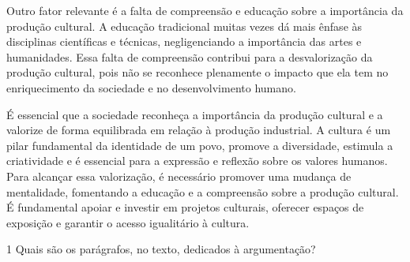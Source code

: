 \begin{escolha}
\begin{escolha}
\begin{escolha}
\begin{escolha}
\begin{escolha}
\begin{escolha}
\begin{escolha}
\begin{escolha}
Outro fator relevante é a falta de compreensão e educação sobre a
importância da produção cultural. A educação tradicional muitas vezes dá
mais ênfase às disciplinas científicas e técnicas, negligenciando a
importância das artes e humanidades. Essa falta de compreensão contribui
para a desvalorização da produção cultural, pois não se reconhece
plenamente o impacto que ela tem no enriquecimento da sociedade e no
desenvolvimento humano.

É essencial que a sociedade reconheça a importância da produção cultural
e a valorize de forma equilibrada em relação à produção industrial. A
cultura é um pilar fundamental da identidade de um povo, promove a
diversidade, estimula a criatividade e é essencial para a expressão e
reflexão sobre os valores humanos. Para alcançar essa valorização, é
necessário promover uma mudança de mentalidade, fomentando a educação e
a compreensão sobre a produção cultural. É fundamental apoiar e investir
em projetos culturais, oferecer espaços de exposição e garantir o acesso
igualitário à cultura.

\num{1} Quais são os parágrafos, no texto, dedicados à argumentação?

\end{escolha}
\end{escolha}
\end{escolha}
\end{escolha}
\end{escolha}
\end{escolha}
\end{escolha}
\end{escolha}
